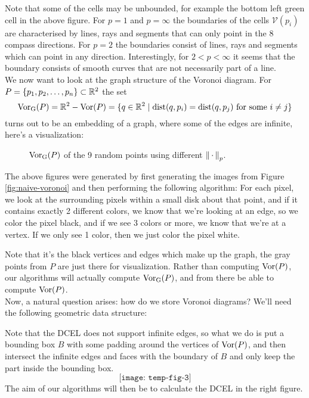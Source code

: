 Note that some of the cells may be unbounded, for example the bottom left green cell in the above figure. For $p = 1$ and $p = \infty$ the boundaries of the cells $\mathcal{V}(p_i)$ are characterised by lines, rays and segments that can only point in the 8 compass directions. For $p = 2$ the boundaries consist of lines, rays and segments which can point in any direction. Interestingly, for $2 < p < \infty$ it seems that the boundary consists of smooth curves that are not necessarily part of a line. \\

We now want to look at the graph structure of the Voronoi diagram. For $P = \{p_1, p_2, \ldots, p_n\} \subset \mathbb{R}^2$ the set
\[
    \operatorname{Vor_{G}}(P) = \mathbb{R}^2 - \operatorname{Vor}(P)
    = \{q \in \mathbb{R}^2 \mid \operatorname{dist}(q, p_i) = \operatorname{dist}(q, p_j) \text{ for some } i \ne j\}
\]
turns out to be an embedding of a graph, where some of the edges are infinite, here's a visualization:
\begin{figure}[H]
    \centering
    \hspace{0mm}
    \caption{$\operatorname{Vor_{G}}(P)$ of the 9 random points using different $\left\lVert \,\cdot\, \right\rVert_p$.}
\end{figure}
The above figures were generated by first generating the images from Figure \ref{fig:naive-voronoi} and then performing the following algorithm: For each pixel, we look at the surrounding pixels within a small disk about that point, and if it contains exactly 2 different colors, we know that we're looking at an edge, so we color the pixel black, and if we see 3 colors or more, we know that we're at a vertex. If we only see 1 color, then we just color the pixel white.

Note that it's the black vertices and edges which make up the graph, the gray points from $P$ are just there for visualization. Rather than computing $\operatorname{Vor}(P)$, our algorithms will actually compute $\operatorname{Vor_{G}}(P)$, and from there be able to compute $\operatorname{Vor}(P)$. \\

Now, a natural question arises: how do we store Voronoi diagrams? We'll need the following geometric data structure:
\begin{defn}[DCEL]
\end{defn}
Note that the DCEL does not support infinite edges, so what we do is put a bounding box $B$ with some padding around the vertices of $\operatorname{Vor}(P)$, and then intersect the infinite edges and faces with the boundary of $B$ and only keep the part inside the bounding box.
\[
    \texttt{[image: temp-fig-3]}
\]
The aim of our algorithms will then be to calculate the DCEL in the right figure.